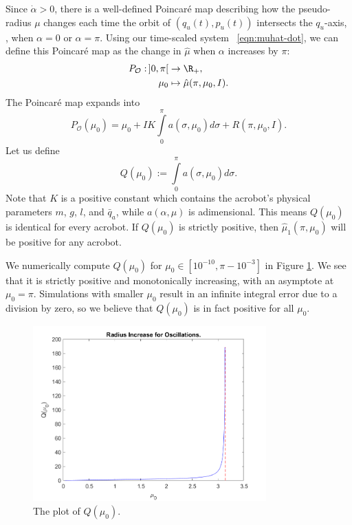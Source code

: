 Since \(\dot{\alpha} > 0\), there is a well-defined Poincar\'{e} map 
describing how the pseudo-radius \(\mu\) changes each time the orbit of \((q_u(t),p_u(t))\)
intersects the \(q_u\)-axis, \ie, when \(\alpha = 0\) or \(\alpha = \pi\).
Using our time-scaled system ~\eqref{eqn:muhat-dot}, we can define this
Poincar\'{e} map as the change in \(\hat{\mu}\) when \(\alpha\) increases by
\(\pi\):
\begin{align*}
    P_\mathcal{O} : \,]0,\pi[ &\rightarrow \R_+,
    \\
    \mu_0 &\mapsto \hat{\mu}(\pi,\mu_0,I)
    .
\end{align*}
The Poincar\'{e} map expands into
\[
    P_\mathcal{O}(\mu_0) = \mu_0 + I K \int\limits_0^\pi a(\sigma,\mu_0)d\sigma
    + R(\pi,\mu_0,I)
    .
\]
Let us define
\begin{equation}\label{eqn:acrobot-Qmu}
    Q(\mu_0) := \int \limits_0^\pi a(\sigma,\mu_0)d\sigma
    .
\end{equation}
Note that \(K\) is a positive constant which contains the acrobot's physical
parameters \(m\), \(g\), \(l\), and \(\bar{q}_a\), 
while \(a(\alpha,\mu)\) is adimensional. 
This means \(Q(\mu_0)\) is identical for every acrobot.
If \(Q(\mu_0)\) is strictly positive, then \(\hat{\mu}_1(\pi,\mu_0)\) will be
positive for any acrobot.

We numerically compute \(Q(\mu_0)\) for \(\mu_0 \in [10^{-10}, \pi - 10^{-3}]\)
in Figure \ref{fig:acrobot-Q}. 
We see that it is strictly positive and monotonically increasing, with
an asymptote at \(\mu_0 = \pi\). 
Simulations with smaller \(\mu_0\) result in an infinite integral error due
to a division by zero, so we believe that \(Q(\mu_0)\) is in fact positive for
all \(\mu_0\).

\begin{figure}
    \centering
    \includegraphics[width=0.8\textwidth]{images/Qmu.png}
    \caption{The plot of \(Q(\mu_0)\).}
    \label{fig:acrobot-Q}
\end{figure}

